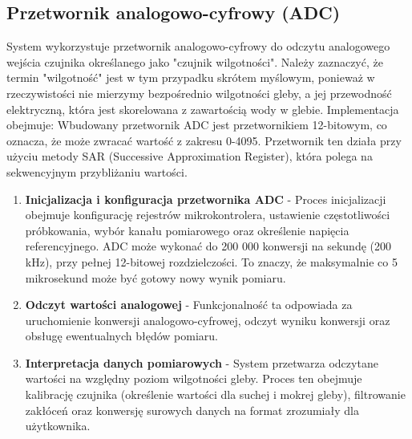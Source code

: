 
\subsection{Przetwornik analogowo-cyfrowy (ADC)}
\label{sec:ADC}
System wykorzystuje przetwornik analogowo-cyfrowy do odczytu analogowego wejścia czujnika określanego jako "czujnik wilgotności". Należy zaznaczyć, że termin "wilgotność" jest w tym przypadku skrótem myślowym, ponieważ w rzeczywistości nie mierzymy bezpośrednio wilgotności gleby, a jej przewodność elektryczną, która jest skorelowana z zawartością wody w glebie. Implementacja obejmuje:
Wbudowany przetwornik ADC jest przetwornikiem 12-bitowym, co oznacza, że może zwracać wartość z zakresu 0-4095. Przetwornik ten działa przy użyciu metody SAR (Successive Approximation Register), która polega na sekwencyjnym przybliżaniu wartości.
\begin{enumerate}
    \item \textbf{Inicjalizacja i konfiguracja przetwornika ADC} - Proces inicjalizacji obejmuje konfigurację rejestrów mikrokontrolera, ustawienie częstotliwości próbkowania, wybór kanału pomiarowego oraz określenie napięcia referencyjnego. ADC może wykonać do 200 000 konwersji na sekundę (200 kHz), przy pełnej 12-bitowej rozdzielczości. To znaczy, że maksymalnie co 5 mikrosekund może być gotowy nowy wynik pomiaru. 
    
    \item \textbf{Odczyt wartości analogowej} - Funkcjonalność ta odpowiada za uruchomienie konwersji analogowo-cyfrowej, odczyt wyniku konwersji oraz obsługę ewentualnych błędów pomiaru.
    
    \item \textbf{Interpretacja danych pomiarowych} - System przetwarza odczytane wartości na względny poziom wilgotności gleby. Proces ten obejmuje kalibrację czujnika (określenie wartości dla suchej i mokrej gleby), filtrowanie zakłóceń oraz konwersję surowych danych na format zrozumiały dla użytkownika.
\end{enumerate}


